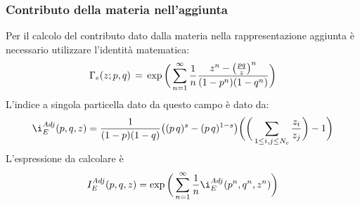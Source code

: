 \documentclass[a4paper,12pt]{report}
\begin{document}
\subsubsection{Contributo della materia nell'aggiunta}
Per il calcolo del contributo dato dalla materia nella rappresentazione aggiunta è necessario utilizzare l'identità matematica:
$$
\Gamma_e(z;p,q) \, = \, \exp \bigg( \sum_{n=1}^{\infty} {1 \over n }
 \frac{ z^n - \big( {pq \over z} \big)^n }{(1-p^n) ( 1-q^n)} \bigg)
 \label{Gamma_eChiral}
$$
L'indice a singola particella dato da questo campo è dato da:
$$
\i_E^{Adj}(p,q,z) = {1 \over (1-p)(1-q)}
\big((p\,q)^{s}- (p\,q)^{1-s}\big) \bigg( \bigg(  \sum_{ 1 \leq i,j \leq N_c}  {z_i\over z_j}  \bigg)- 1 \bigg)
$$
L'espressione da calcolare è
\begin{equation}
I_E^{Adj}(p,q,z)  = \exp \bigg(  \sum_{n=1}^{\infty} {1 \over n } \i_E^{Adj}(p^n,q^n,z^n) \bigg)
\end{equation}
\end{document}

